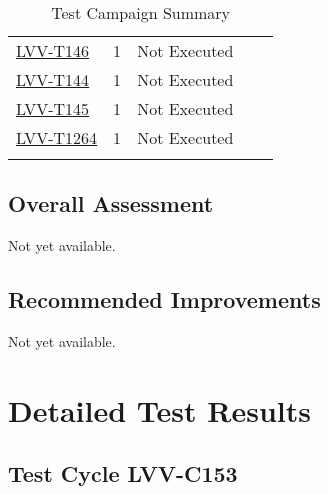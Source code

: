 \documentclass[DM,lsstdraft,STR,toc]{lsstdoc}
\begin{document}
{\begin{longtable}{p{2cm}cp{2.3cm}p{8.6cm}p{2.3cm}}
\begin{minipage}[]{9cm}
\medskip
\end{minipage}
&
\\\hline
\href{https://jira.lsstcorp.org/secure/Tests.jspa#/testCase/LVV-T146}{LVV-T146}
&  1
& Not Executed &
\begin{minipage}[]{9cm}
\smallskip

\medskip
\end{minipage}
&
\\\hline
\href{https://jira.lsstcorp.org/secure/Tests.jspa#/testCase/LVV-T144}{LVV-T144}
&  1
& Not Executed &
\begin{minipage}[]{9cm}
\smallskip

\medskip
\end{minipage}
&
\\\hline
\href{https://jira.lsstcorp.org/secure/Tests.jspa#/testCase/LVV-T145}{LVV-T145}
&  1
& Not Executed &
\begin{minipage}[]{9cm}
\smallskip

\medskip
\end{minipage}
&
\\\hline
\href{https://jira.lsstcorp.org/secure/Tests.jspa#/testCase/LVV-T1264}{LVV-T1264}
&  1
& Not Executed &
\begin{minipage}[]{9cm}
\smallskip

\medskip
\end{minipage}
&
\\\hline
\caption{Test Campaign Summary}
\label{table:summary}
\end{longtable}
}

\subsection{Overall Assessment}
\label{sect:overallassessment}

Not yet available.

\subsection{Recommended Improvements}
\label{sect:recommendations}

Not yet available.

\newpage
\section{Detailed Test Results}
\label{sect:detailedtestresults}

\subsection{Test Cycle LVV-C153 }
\end{document}

